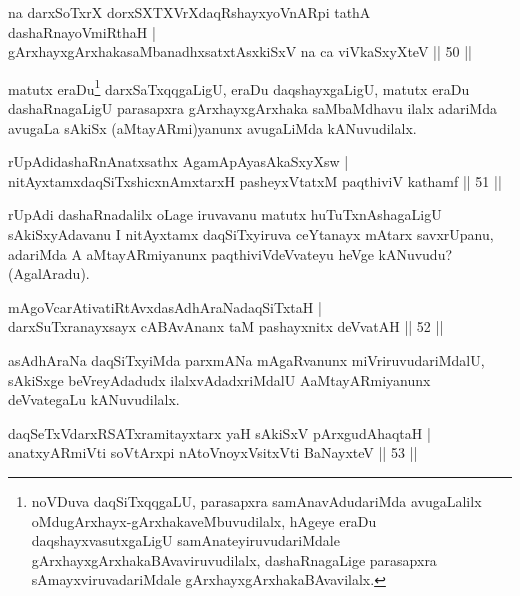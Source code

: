 \begin{shl}
na darxSoTxrX dorxSXTXVrXdaqRshayxyoVnARpi tathA dashaRnayoVmiRthaH |\\
gArxhayxgArxhakasaMbanadhxsatxtAsxkiSxV na ca viVkaSxyXteV \hfill || 50 ||
\end{shl}

\begin{artha}%
matutx eraDu\footnote{noVDuva daqSiTxqqgaLU, parasapxra samAnavAdudariMda avugaLalilx oMdu\break gArxhayx-gArxhakaveMbuvudilalx, hAgeye eraDu daqshayxvasutxgaLigU samAnateyiruvudariMdale gArxhayxgArxhakaBAvaviruvudilalx, dashaRnagaLige parasapxra sAmayxviruvadariMdale gArxhayxgArxhakaBAvavilalx.} darxSaTxqqgaLigU, eraDu daqshayxgaLigU, matutx eraDu dashaRnagaLigU parasapxra gArxhayxgArxhaka saMbaMdhavu ilalx adariMda avugaLa sAkiSx (aMtayARmi)yanunx avugaLiMda kANuvudilalx.
\end{artha}

\begin{shl}
rUpAdidashaRnAnatxsathx AgamApAyasAkaSxyXsw |\\
nitAyxtamxdaqSiTxshicxnAmxtarxH pasheyxVtatxM paqthiviV kathamf \hfill || 51 ||
\end{shl}

\begin{artha}
rUpAdi dashaRnadalilx oLage iruvavanu matutx huTuTxnAshagaLigU sAkiSxyAdavanu I nitAyxtamx daqSiTxyiruva ceYtanayx mAtarx savxrUpanu, adariMda A aMtayARmiyanunx paqthiviVdeVvateyu heVge kANuvudu? (AgalAradu).
\end{artha}

\begin{shl}
mAgoVcarAtivatiRtAvxdasAdhAraNadaqSiTxtaH |\\
darxSuTxranayxsayx cABAvAnanx taM pashayxnitx deVvatAH \hfill || 52 ||
\end{shl}

\begin{artha}
asAdhAraNa daqSiTxyiMda parxmANa mAgaRvanunx miVriruvudariMdalU, sAkiSxge beVreyAdadudx ilalxvAdadxriMdalU A\break aMtayARmiyanunx deVvategaLu kANuvudilalx.
\end{artha}


\begin{shl}
daqSeTxVdarxRSATxramitayxtarx yaH sAkiSxV pArxgudAhaqtaH |\\
anatxyARmiVti soV\s tArxpi nAtoV\s noyxV\s sitxVti BaNayxteV \hfill || 53 ||
\end{shl}

